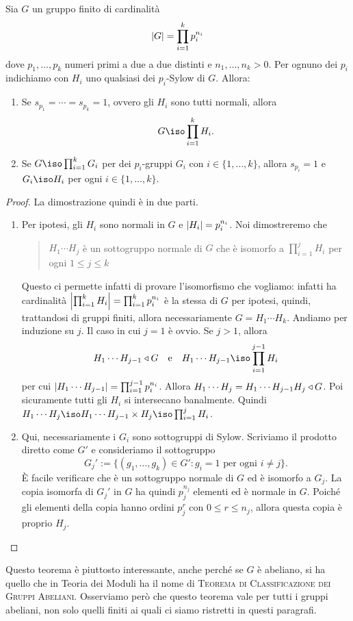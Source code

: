 \begin{teor}\label{teor:ClassificazioneGruppiFiniti}
Sia $G$ un gruppo finito di cardinalità
\[\left\lvert G\right\rvert=\prod_{i=1}^kp_i^{n_i}\]
dove $p_1,\dots,p_k$ numeri primi a due a due distinti e $n_1,\dots,n_k > 0$. Per ognuno dei $p_i$ indichiamo con $H_i$ uno qualsiasi dei $p_i$-Sylow di $G$. Allora:
\begin{enumerate}
\item Se $s_{p_1} = \cdots = s_{p_k} = 1$, ovvero gli $H_i$ sono tutti normali, allora
\[G \iso \prod_{i=1}^k H_i .\]
\item Se $G \iso \prod_{i=1}^k G_i$ per dei $p_i$-gruppi $G_i$ con $i \in \{1,\dots,k\}$, allora $s_{p_i} = 1$ e $G_i \iso H_i$ per ogni $i \in \{1,\dots,k\}$.
\end{enumerate}
\end{teor}

\begin{proof} La dimostrazione quindi è in due parti.
\begin{enumerate}
\item Per ipotesi, gli $H_i$ sono normali in $G$ e $\left\lvert H_i\right\rvert = p_i^{n_i}$. Noi dimostreremo che 
\begin{quotation}
$H_1\cdots{} H_j$ è un sottogruppo normale di $G$ che è isomorfo a $\prod_{i=1}^j H_i$ per ogni $1 \le j \le k$
\end{quotation}
Questo ci permette infatti di provare l'isomorfismo che vogliamo: infatti ha cardinalità $\left\lvert\prod_{i=1}^k H_i\right\rvert = \prod_{i=1}^k p_i^{n_i}$ è la stessa di $G$ per ipotesi, quindi, trattandosi di gruppi finiti, allora necessariamente $G = H_1 \cdots H_k$.\newline
Andiamo per induzione su $j$. Il caso in cui $j=1$ è ovvio. Se $j>1$, allora
\[H_1 \cdots{} H_{j-1} \normal G \quad \text{e} \quad H_1 \cdots{} H_{j-1} \iso \prod_{i=1}^{j-1} H_i\]
per cui $\left\lvert H_1 \cdots{} H_{j-1}\right\rvert=\prod_{i=1}^{j-1}p_i^{n_i}$. Allora $H_1 \cdots{} H_j = H_1 \cdots{} H_{j-1}H_j \triangleleft G$. Poi sicuramente tutti gli $H_i$ si intersecano banalmente. Quindi $H_1 \cdots{} H_j \iso H_1 \cdots{} H_{j-1} \times H_j\iso\prod_{i=1}^j H_i$.
\item Qui, necessariamente i $G_i$ sono sottogruppi di Sylow. Scriviamo il prodotto diretto come $G'$ e consideriamo il sottogruppo
\[G_j' := \{(g_1, \dots{}, g_k) \in G' : g_i = 1 \text{ per ogni } i \ne j\} .\]
È facile verificare che è un sottogruppo normale di $G$ ed è isomorfo a $G_j$. La copia isomorfa di $G_j'$ in $G$ ha quindi $p_j^{n_j}$ elementi ed è normale in $G$. Poiché gli elementi della copia hanno ordini $p_j^r$ con $0 \le r \le n_j$, allora questa copia è proprio $H_j$. \qedhere
\end{enumerate}
\end{proof}

\begin{osse}
Questo teorema è piuttosto interessante, anche perché se $G$ è abeliano, si ha quello che in Teoria dei Moduli ha il nome di {\scshape Teorema di Classificazione dei Gruppi Abeliani}. Osserviamo però che questo teorema vale per tutti i gruppi abeliani, non solo quelli finiti ai quali ci siamo ristretti in questi paragrafi.
\end{osse}
